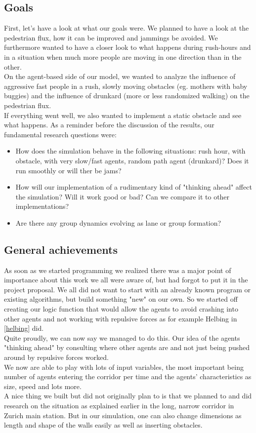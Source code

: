 
\subsection{Goals}
First, let's have a look at what our goals were. We planned to have a look at the pedestrian flux, how it can be improved and jammings be avoided. We furthermore wanted to have a closer look to what happens during rush-hours and in a situation when much more people are moving in one direction than in the other.\\
On the agent-based side of our model, we wanted to analyze the influence of aggressive fast people in a rush, slowly moving obstacles (eg. mothers with baby buggies) and the influence of drunkard (more or less randomized walking) on the pedestrian flux.\\
If everything went well, we also wanted to implement a static obstacle and see what happens. As a reminder before the discussion of the results, our fundamental research questions were:
\begin{itemize}
\item How does the simulation behave in the following situations: rush hour, with obstacle, with very slow/fast agents, random path agent (drunkard)? Does it run smoothly or will ther be jams?
\item How will our implementation of a rudimentary kind of "thinking ahead" affect the simulation? Will it work good or bad? Can we compare it to other implementations?
\item Are there any group dynamics evolving as lane or group formation?
\end{itemize}

\subsection{General achievements}
As soon as we started programming we realized there was a major point of importance about this work we all were aware of, but had forgot to put it in the project proposal. We all did not want to start with an already known program or existing algorithms, but build something "new" on our own. So we started off creating our logic function that would allow the agents to avoid crashing into other agents and not working with repulsive forces as for example Helbing in \ref{helbing} did.\\
Quite proudly, we can now say we managed to do this. Our idea of the agents "thinking ahead" by consulting where other agents are and not just being pushed around by repulsive forces worked.\\
We now are able to play with lots of input variables, the most important being number of agents entering the corridor per time and the agents' characteristics as size, speed and lots more.\\
A nice thing we built but did not originally plan to is that we planned to and did research on the situation as explained earlier in the long, narrow corridor in Zurich main station. But in our simulation, one can also change dimensions as length and shape of the walls easily as well as inserting obstacles.\\

